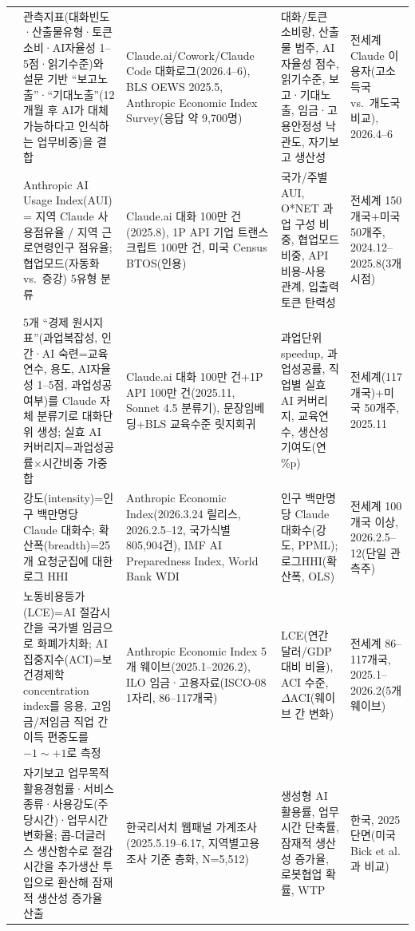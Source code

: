 \documentclass[11pt]{article}
\begin{document}
\begin{longtable}{L{2.3cm}L{4.1cm}L{3.6cm}L{2.6cm}L{2.3cm}}
\citet{massenkoff-2026-cadences} &
관측지표(대화빈도·산출물유형·토큰소비·AI자율성 1--5점·읽기수준)와 설문 기반 ``보고노출''·``기대노출''(12개월 후 AI가 대체 가능하다고 인식하는 업무비중)을 결합 &
Claude.ai/Cowork/Claude Code 대화로그(2026.4--6), BLS OEWS 2025.5, Anthropic Economic Index Survey(응답 약 9,700명) &
대화/토큰 소비량, 산출물 범주, AI자율성 점수, 읽기수준, 보고·기대노출, 임금·고용안정성 낙관도, 자기보고 생산성 &
전세계 Claude 이용자(고소득국 vs.\ 개도국 비교), 2026.4--6\\

\citet{appel-2025-uneven-geographic-and-enterprise-ai} &
Anthropic AI Usage Index(AUI) = 지역 Claude 사용점유율 / 지역 근로연령인구 점유율; 협업모드(자동화 vs.\ 증강) 5유형 분류 &
Claude.ai 대화 100만 건(2025.8), 1P API 기업 트랜스크립트 100만 건, 미국 Census BTOS(인용) &
국가/주별 AUI, O*NET 과업 구성 비중, 협업모드 비중, API 비용-사용 관계, 입출력 토큰 탄력성 &
전세계 150개국+미국 50개주, 2024.12--2025.8(3개 시점)\\

\citet{appel-2026-economic-primitives} &
5개 ``경제 원시지표''(과업복잡성, 인간·AI 숙련=교육연수, 용도, AI자율성 1--5점, 과업성공 여부)를 Claude 자체 분류기로 대화단위 생성; 실효 AI 커버리지=과업성공률$\times$시간비중 가중합 &
Claude.ai 대화 100만 건+1P API 100만 건(2025.11, Sonnet 4.5 분류기), 문장임베딩+BLS 교육수준 릿지회귀 &
과업단위 speedup, 과업성공률, 직업별 실효 AI 커버리지, 교육연수, 생산성 기여도(연 \%p) &
전세계(117개국)+미국 50개주, 2025.11\\

\citet{fan-2026-what-countries-use-ai-and} &
강도(intensity)=인구 백만명당 Claude 대화수; 확산폭(breadth)=25개 요청군집에 대한 로그 HHI &
Anthropic Economic Index(2026.3.24 릴리스, 2026.2.5--12, 국가식별 805,904건), IMF AI Preparedness Index, World Bank WDI &
인구 백만명당 Claude 대화수(강도, PPML); 로그HHI(확산폭, OLS) &
전세계 100개국 이상, 2026.2.5--12(단일 관측주)\\

\citet{fan-2026-aggregate-gains-from-ai} &
노동비용등가(LCE)=AI 절감시간을 국가별 임금으로 화폐가치화; AI집중지수(ACI)=보건경제학 concentration index를 응용, 고임금/저임금 직업 간 이득 편중도를 $-1\sim+1$로 측정 &
Anthropic Economic Index 5개 웨이브(2025.1--2026.2), ILO 임금·고용자료(ISCO-08 1자리, 86--117개국) &
LCE(연간 달러/GDP대비 비율), ACI 수준, $\Delta$ACI(웨이브 간 변화) &
전세계 86--117개국, 2025.1--2026.2(5개 웨이브)\\

\citet{bok-2025-rapid-ai-diffusion-productivity-effects} &
자기보고 업무목적 활용경험률·서비스종류·사용강도(주당시간)·업무시간 변화율; 콥-더글러스 생산함수로 절감시간을 추가생산 투입으로 환산해 잠재적 생산성 증가율 산출 &
한국리서치 웹패널 가계조사(2025.5.19--6.17, 지역별고용조사 기준 층화, N=5,512) &
생성형 AI 활용률, 업무시간 단축률, 잠재적 생산성 증가율, 로봇협업 확률, WTP &
한국, 2025 단면(미국 Bick et al.과 비교)\\


\end{longtable}
\end{document}
